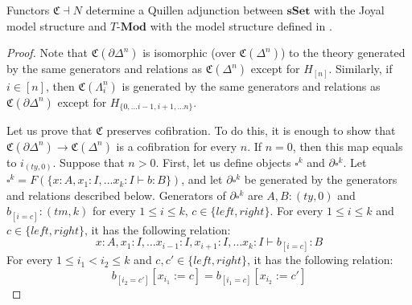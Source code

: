 \documentclass[reqno]{amsart}
\theoremstyle{definition}
\theoremstyle{remark}
\newcommand{\repl}{:=}
\newcommand{\cat}[1]{\mathbf{#1}}
\newcommand{\Mod}[1]{#1\text{-}\cat{Mod}}
\newcommand{\sSet}{\cat{sSet}}
\newcommand{\M}{H}
\numberwithin{figure}{section}
\begin{document}
\begin{prop}
Functors $\mathfrak{C} \dashv N$ determine a Quillen adjunction between $\sSet$ with the Joyal model structure and $\Mod{T}$ with the model structure defined in \cite{alg-models}.
\end{prop}
\begin{proof}
Note that $\mathfrak{C}(\partial \Delta^n)$ is isomorphic (over $\mathfrak{C}(\Delta^n)$) to the theory
generated by the same generators and relations as $\mathfrak{C}(\Delta^n)$ except for $\M_{[n]}$.
Similarly, if $i \in [n]$, then $\mathfrak{C}(\Lambda^n_i)$ is generated by the same generators
and relations as $\mathfrak{C}(\partial \Delta^n)$ except for $\M_{\{ 0, \ldots i-1, i+1, \ldots n \}}$.

Let us prove that $\mathfrak{C}$ preserves cofibration.
To do this, it is enough to show that $\mathfrak{C}(\partial \Delta^n) \to \mathfrak{C}(\Delta^n)$ is a cofibration for every $n$.
If $n = 0$, then this map equals to $i_{(ty,0)}$.
Suppose that $n > 0$.
First, let us define objects $\square^k$ and $\partial \square^k$.
Let $\square^k = F(\{ x : A, x_1 : I, \ldots x_k : I \vdash b : B \})$,
and let $\partial \square^k$ be generated by the generators and relations described below.
Generators of $\partial \square^k$ are $A,B : (ty,0)$ and $b_{[i=c]} : (tm,k)$ for every $1 \leq i \leq k$, $c \in \{left,right\}$.
For every $1 \leq i \leq k$ and $c \in \{left,right\}$, it has the following relation:
\[ x : A, x_1 : I, \ldots x_{i-1} : I, x_{i+1} : I, \ldots x_k : I \vdash b_{[i=c]} : B \]
For every $1 \leq i_1 < i_2 \leq k$ and $c,c' \in \{left,right\}$, it has the following relation:
\[ b_{[i_2=c']}[x_{i_1} \repl c] = b_{[i_1=c]}[x_{i_2} \repl c'] \]


\end{proof}
\end{document}
